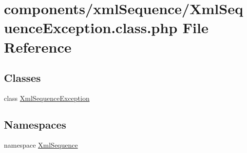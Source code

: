 \hypertarget{_xml_sequence_exception_8class_8php}{
\section{components/xmlSequence/XmlSequenceException.class.php File Reference}
\label{_xml_sequence_exception_8class_8php}
}
\subsection*{Classes}
\begin{CompactItemize}
\item 
class \hyperlink{class_xml_sequence_exception}{XmlSequenceException}
\end{CompactItemize}
\subsection*{Namespaces}
\begin{CompactItemize}
\item 
namespace \hyperlink{namespace_xml_sequence}{XmlSequence}
\end{CompactItemize}

